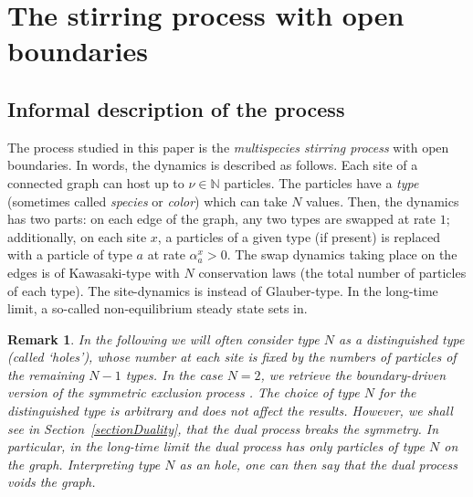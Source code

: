 \documentclass[10pt]{article}
\numberwithin{equation}{section}
\numberwithin{equation}{subsection}
\newtheorem{remark}{Remark}
\begin{document}
\section{The stirring process with open boundaries}
\label{sec1}
\subsection{Informal description of the process}
The process studied in this paper is the {\em multispecies stirring process}
with open boundaries. 
In words, the dynamics is described as follows. Each site
of a connected graph can host up to $\nu\in \mathbb{N}$ particles.
The particles have a {\em type} (sometimes called {\em species} or {\em color})
which can take $N$ values.
Then, the dynamics has two parts: on each edge of the graph, 
any two types are swapped at rate $1$; additionally, on each site $x$, 
a particles of a given type (if present) is replaced with a
particle of type $a$ at rate $\alpha_a^x >0$.
The swap dynamics taking place on the edges is of Kawasaki-type 
with $N$ conservation laws
(the total number of particles of each type). 
The site-dynamics is instead of Glauber-type. 
In the long-time limit, a so-called non-equilibrium
steady state sets in.


\noindent
\begin{remark}
\label{hole}
In the following we will often consider type $N$ as a distinguished type
(called `holes'), whose number at each site is fixed by the numbers of particles 
of the remaining $N-1$ types. 
In the case $N=2$, we retrieve the  boundary-driven version of the symmetric exclusion process \cite{schutzSandow,carinci2013duality}.
The choice of type $N$ for the distinguished type is arbitrary and does not affect
the results. However, we shall see in Section~\ref{sectionDuality}, that
the dual process breaks the symmetry.
In particular, in the  long-time limit the dual process has only particles of type $N$ on the graph.
Interpreting type $N$ as an hole, one can then say that the dual process voids the graph.   
\end{remark}
\end{document}
